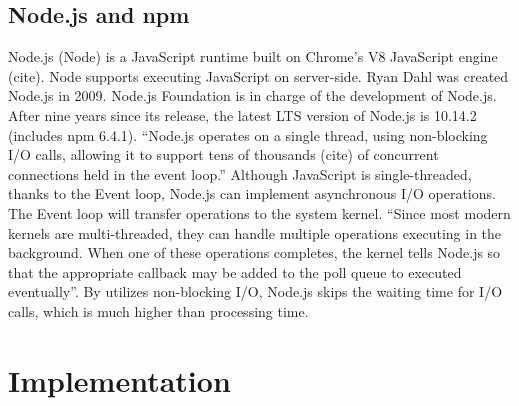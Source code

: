 \subsection{Node.js and npm}
Node.js (Node) is a JavaScript runtime built on Chrome's V8 JavaScript engine (cite). Node supports executing JavaScript on server-side. Ryan Dahl was created Node.js in 2009. Node.js Foundation is in charge of the development of Node.js. After nine years since its release, the latest LTS version of Node.js is 10.14.2 (includes npm 6.4.1). “Node.js operates on a single thread, using non-blocking I/O calls, allowing it to support tens of thousands (cite) of concurrent connections held in the event loop.” Although JavaScript is single-threaded, thanks to the Event loop, Node.js can implement asynchronous I/O operations. The Event loop will transfer operations to the system kernel. “Since most modern kernels are multi-threaded, they can handle multiple operations executing in the background. When one of these operations completes, the kernel tells Node.js so that the appropriate callback may be added to the poll queue to executed eventually”. By utilizes non-blocking I/O, Node.js skips the waiting time for I/O calls, which is much higher than processing time.
\section{Implementation}